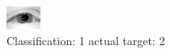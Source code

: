 \begin{figure}[h!]
\begin{center}
\includegraphics[width=0.60\columnwidth]{figures/ID2361_class_1_target_2.png}
\end{center}
\caption{ Classification: 1 actual target: 2}
\label{fig:ID2361_class_1_target_2}
\end{figure}
